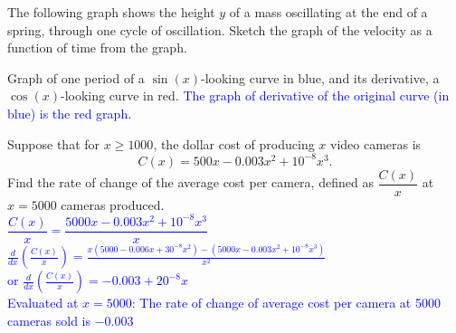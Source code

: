 \documentclass{ximera}
\begin{document}
\begin{exercise}
    The following graph shows the height $y$ of a mass oscillating at the end of a spring, through one cycle of oscillation.  Sketch the graph of the velocity as a function of time from the graph.
    \begin{image}
    \end{image}
    \xmalt Graph of one period of a $\sin(x)$-looking curve in blue, and its derivative, a $\cos(x)$-looking curve in red.
    \textcolor{blue}{The graph of derivative of the original curve (in blue) is the red graph.}
\end{exercise}

\begin{exercise}
    Suppose that for $x\geq 1000$, the dollar cost of producing $x$ video cameras is $$C(x)=500x-0.003x^2+10^{-8}x^3.$$  Find the rate of change of the average cost per camera, defined as $\dfrac{C(x)}{x}$ at $x=5000$ cameras produced.\\
    \textcolor{blue}{$\dfrac{C(x)}{x}=\dfrac{5000x-0.003x^2+10^{-8}x^3}{x}$\\
    $\displaystyle \frac{d}{dx}(\frac{C(x)}{x})=\frac{x(5000-0.006x+30^{-8}x^2)-(5000x-0.003x^2+10^{-8}x^3)}{x^2}$\\
    or $\displaystyle \frac{d}{dx}(\frac{C(x)}{x})=-0.003+20^{-8}x$\\
    Evaluated at $x=5000$: The rate of change of average cost per camera at 5000 cameras sold is $-0.003$}
\end{exercise}
\end{document}
